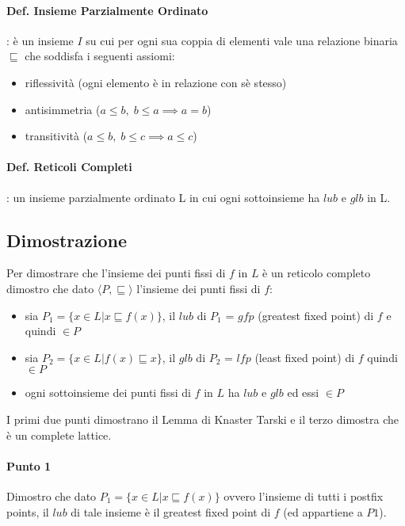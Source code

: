 \documentclass{article}
\begin{document}
\paragraph{Def. Insieme Parzialmente Ordinato}: è un insieme $I$ su cui per ogni sua coppia di elementi vale una relazione binaria $\sqsubseteq$ che soddisfa i seguenti assiomi:
\begin{itemize}
\item riflessività (ogni elemento è in relazione con sè stesso)
\item antisimmetria ($a \leq b, \; b \leq a \implies a=b$)
\item transitività ($a \leq b, \; b \leq c \implies a \leq c$)
\end{itemize}



\paragraph{Def. Reticoli Completi}: un insieme parzialmente ordinato L in cui ogni sottoinsieme ha $lub$ e $glb$ in L.

\subsection{Dimostrazione}
Per dimostrare che l'insieme dei punti fissi di $f$ in $L$ è un reticolo completo dimostro che dato $\langle P,\sqsubseteq\rangle$ l'insieme dei punti fissi di $f$:
\begin{itemize}
    \item sia $P_1 =\{x \in L | x  \sqsubseteq f(x)\}$, il $lub$ di $P_1$ = $gfp$ (greatest fixed point) di $f$ e quindi $\in P$
    \item sia $P_2 =\{x \in L | f(x)  \sqsubseteq x\}$, il $glb$ di $P_2$ = $lfp$ (least fixed point) di $f$ quindi $\in P$
    \item ogni sottoinsieme dei punti fissi di $f$ in $L$ ha $lub$ e $glb$ ed essi $\in P$
\end{itemize}

I primi due punti dimostrano il Lemma di Knaster Tarski e il terzo dimostra che è un complete lattice.

\paragraph{Punto 1}

Dimostro che dato $P_{1}=\{x \in L | x  \sqsubseteq f(x)\}$ ovvero l'insieme di tutti i postfix points, il $lub$ di tale insieme è il greatest fixed point di $f$ (ed appartiene a $P1$).
\end{document}
